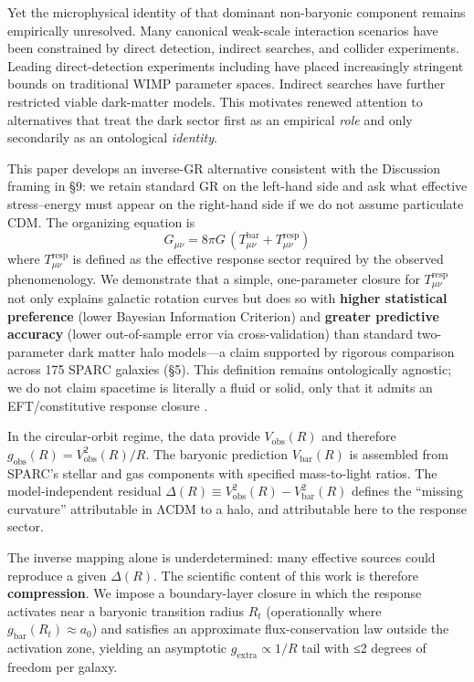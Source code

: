 \documentclass[11pt]{article}
\begin{document}
Yet the microphysical identity of that dominant non-baryonic component remains empirically unresolved. Many canonical weak-scale interaction scenarios have been constrained by direct detection, indirect searches, and collider experiments. Leading direct-detection experiments including \citep{Akerib2017, Aprile2018, Cui2017} have placed increasingly stringent bounds on traditional WIMP parameter spaces. Indirect searches \citep{Aguilar2013} have further restricted viable dark-matter models. This motivates renewed attention to alternatives that treat the dark sector first as an empirical \emph{role} and only secondarily as an ontological \emph{identity}.

This paper develops an inverse-GR alternative consistent with the Discussion framing in §9: we retain standard GR \citep{Einstein1916, Wald1984GR} on the left-hand side and ask what effective stress--energy must appear on the right-hand side if we do not assume particulate CDM. The organizing equation is
\begin{equation}
G_{\mu\nu} = 8\pi G\,\left( T_{\mu\nu}^{\text{bar}} + T_{\mu\nu}^{\text{resp}} \right)
\label{eq:einstein-field-response}
\end{equation}
where \(T_{\mu\nu}^{\text{resp}}\) is defined as the effective response sector required by the observed phenomenology. We demonstrate that a simple, one-parameter closure for \(T_{\mu\nu}^{\text{resp}}\) not only explains galactic rotation curves but does so with \textbf{higher statistical preference} (lower Bayesian Information Criterion) and \textbf{greater predictive accuracy} (lower out-of-sample error via cross-validation) than standard two-parameter dark matter halo models---a claim supported by rigorous comparison across 175 SPARC galaxies (\S5). This definition remains ontologically agnostic; we do not claim spacetime is literally a fluid or solid, only that it admits an EFT/constitutive response closure \citep{Carroll2004, Carroll2019}.

In the circular-orbit regime, the data provide \(V_{\text{obs}}(R)\) and therefore \(g_{\text{obs}}(R) = V_{\text{obs}}^{2}(R)\text{/}R\). The baryonic prediction \(V_{\text{bar}}(R)\) is assembled from SPARC's stellar and gas components with specified mass-to-light ratios. The model-independent residual \(\Delta(R) \equiv V_{\text{obs}}^{2}(R) - V_{\text{bar}}^{2}(R)\) defines the ``missing curvature'' attributable in ΛCDM to a halo, and attributable here to the response sector.

The inverse mapping alone is underdetermined: many effective sources could reproduce a given \(\Delta(R)\). The scientific content of this work is therefore \textbf{compression}. We impose a boundary-layer closure in which the response activates near a baryonic transition radius \(R_{t}\) (operationally where \(g_{\text{bar}}\left( R_{t} \right) \approx a_{0}\)) and satisfies an approximate flux-conservation law outside the activation zone, yielding an asymptotic \(g_{\text{extra}} \propto 1\text{/}R\) tail with ≤2 degrees of freedom per galaxy.
\end{document}
